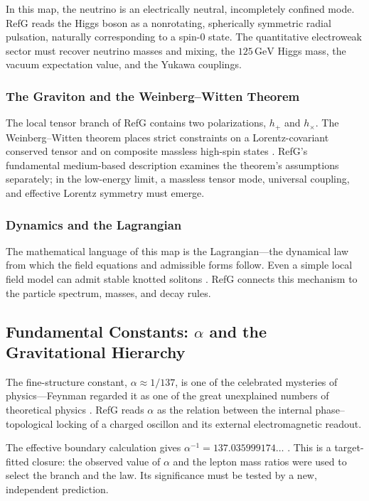 \documentclass[11pt,a4paper]{article}
\begin{document}
In this map, the neutrino is an electrically neutral, incompletely confined mode. RefG reads the Higgs boson as a nonrotating, spherically symmetric radial pulsation, naturally corresponding to a spin-0 state. The quantitative electroweak sector must recover neutrino masses and mixing, the $125\,\mathrm{GeV}$ Higgs mass, the vacuum expectation value, and the Yukawa couplings.

\subsubsection{The Graviton and the Weinberg--Witten Theorem}

The local tensor branch of RefG contains two polarizations, $h_+$ and $h_\times$. The Weinberg--Witten theorem places strict constraints on a Lorentz-covariant conserved tensor and on composite massless high-spin states \citep{weinbergwitten1980}. RefG's fundamental medium-based description examines the theorem's assumptions separately; in the low-energy limit, a massless tensor mode, universal coupling, and effective Lorentz symmetry must emerge.

\subsubsection{Dynamics and the Lagrangian}

The mathematical language of this map is the Lagrangian---the dynamical law from which the field equations and admissible forms follow. Even a simple local field model can admit stable knotted solitons \citep{faddeev1997}. RefG connects this mechanism to the particle spectrum, masses, and decay rules.

\subsection{Fundamental Constants: \texorpdfstring{$\alpha$}{alpha} and the Gravitational Hierarchy}

The fine-structure constant, $\alpha\approx1/137$, is one of the celebrated mysteries of physics---Feynman regarded it as one of the great unexplained numbers of theoretical physics \citep{feynman1985}. RefG reads $\alpha$ as the relation between the internal phase--topological locking of a charged oscillon and its external electromagnetic readout.

The effective boundary calculation gives $\alpha^{-1}=137.035999174\ldots$ \citep{lotishvili2026a}. This is a target-fitted closure: the observed value of $\alpha$ and the lepton mass ratios were used to select the branch and the law. Its significance must be tested by a new, independent prediction.
\end{document}
